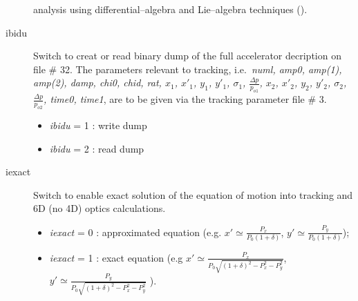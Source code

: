 \documentclass[a4paper,11pt]{report}
\begin{document}
\begin{description}
  analysis using differential--algebra and Lie--algebra techniques
  (\cite{Refine}).
\item [ibidu] Switch to creat or read binary dump of the full
  accelerator decription on file \# 32. The parameters relevant to
  tracking, i.e.\ {\em numl, amp0, amp(1), amp(2), damp, chi0, chid,
    rat, $x_1$, $x'_1$, $y_1$, $y'_1$, ${\sigma}_1$, $\frac{\Delta
      p}{p_{o1}}$, $x_2$, $x'_2$, $y_2$, $y'_2$, ${\sigma}_2$,
    $\frac{\Delta p}{p_{o2}}$, time0, time1}, are to be given via the
  tracking parameter file \# 3.
 \begin{itemize}
 \item {\em ibidu} \/= 1 : write dump
 \item {\em ibidu} \/= 2 : read dump
 \end{itemize}
\item [iexact] Switch to enable exact solution of the equation of motion into
  tracking and 6D (no 4D) optics calculations.
  \begin{itemize}
    \item {\em iexact} \/= 0 : approximated equation
              (e.g. $x'\simeq \frac{P_x}{P_0(1+\delta)}$,
                    $y'\simeq \frac{P_y}{P_0(1+\delta)}$);
    \item {\em iexact} \/= 1 : exact equation (e.g
      $x'\simeq \frac{P_x}{P_0\sqrt{(1+\delta)^2-P_x^2-P_y^2}}$,
      $y'\simeq \frac{P_y}{P_0\sqrt{(1+\delta)^2-P_x^2-P_y^2}}$ ).
 \end{itemize}
\end{description}
\end{document}
